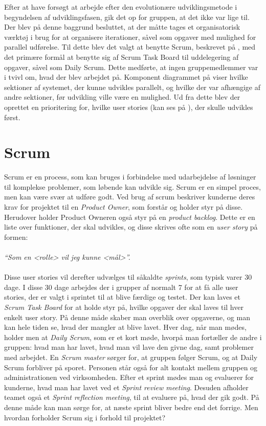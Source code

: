 Efter at have forsøgt at arbejde efter den evolutionære udviklingsmetode i begyndelsen af udviklingsfasen, gik det op for gruppen, at det ikke var lige til.
Der blev på denne baggrund besluttet, at der måtte tages et organisatorisk værktøj i brug for at organisere iterationer, såvel som opgaver med mulighed for parallel udførelse.
Til dette blev det valgt at benytte Scrum, beskrevet på , med det primære formål at benytte sig af Scrum Task Board til uddelegering af opgaver, såvel som Daily Scrum. 
Dette medførte, at ingen gruppemedlemmer var i tvivl om, hvad der blev arbejdet på.
Komponent diagrammet på  viser hvilke sektioner af systemet, der kunne udvikles parallelt, og hvilke der var afhængige af andre sektioner, før udvikling ville være en mulighed.
Ud fra dette blev der oprettet en prioritering for, hvilke user stories (kan ses på ), der skulle udvikles først.

\section{Scrum}\label{scrum}
Scrum er en process, som kan bruges i forbindelse med udarbejdelse af løsninger til komplekse problemer, som løbende kan udvikle sig. 
Scrum er en simpel proces, men kan være svær at udføre godt.
Ved brug af scrum beskriver kunderne deres krav for projektet til en \textit{Product Owner}, som  forstår og holder styr på disse.
Herudover holder Product Owneren også styr på en \textit{product backlog}.
Dette er en liste over funktioner, der skal udvikles, og disse skrives ofte som en \textit{user story} på formen:\\ \\ \textit{``Som en <rolle> vil jeg kunne <mål>''. }\\ \\
Disse user stories vil derefter udvælges til såkaldte \textit{sprints}, som typisk varer 30 dage. 
I disse 30 dage arbejdes der i grupper af normalt 7 for at få alle user stories, der er valgt i sprintet til at blive færdige og testet.
Der kan laves et \textit{Scrum Task Board} for at holde styr på, hvilke opgaver der skal laves til hver enkelt user story. 
På denne måde skaber man overblik over opgaverne, og man kan hele tiden se, hvad der mangler at blive lavet.
Hver dag, når man mødes, holder men at \textit{Daily Scrum}, som er et kort møde, hvorpå man fortæller de andre i gruppen: hvad man har lavet, hvad man vil lave den givne dag, samt problemer med arbejdet.
En \textit{Scrum master} sørger for, at gruppen følger Scrum, og at Daily Scrum forbliver på sporet. 
Personen står også for alt kontakt mellem gruppen og administrationen ved virksomheden.
Efter et sprint mødes man og evaluerer for kunderne, hvad man har lavet ved et \textit{Sprint review meeting}.
Desuden afholder teamet også et \textit{Sprint reflection meeting}, til at evaluere på, hvad der gik godt.
På denne måde kan man sørge for, at næste sprint bliver bedre end det forrige. \citep{A&I_DEV}
Men hvordan forholder Scrum sig i forhold til projektet?

